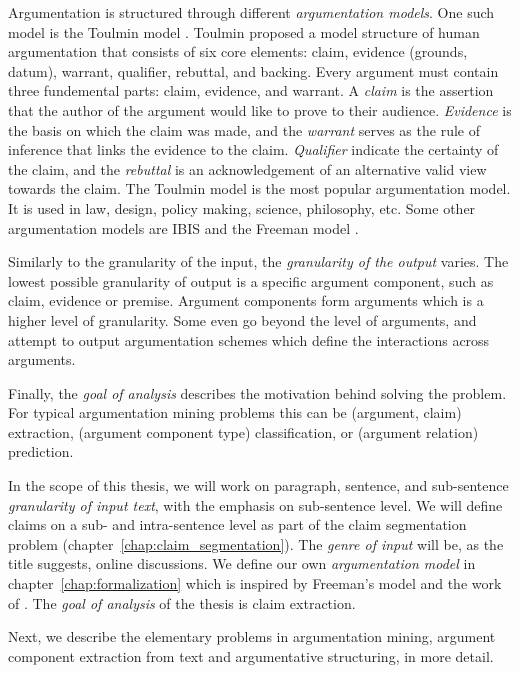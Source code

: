 Argumentation is structured through different \emph{argumentation models}. One
such model is the Toulmin model \citep{toulmin2003uses}. Toulmin proposed a
model structure of human argumentation that consists of six core elements:
claim, evidence (grounds, datum), warrant, qualifier, rebuttal, and backing.
Every argument must contain three fundemental parts: claim, evidence, and
warrant. A \emph{claim} is the assertion that the author of the argument would
like to prove to their audience. \emph{Evidence} is the basis on which the
claim was made, and the \emph{warrant} serves as the rule of inference that
links the evidence to the claim. \emph{Qualifier} indicate the certainty of the
claim, and the \emph{rebuttal} is an acknowledgement of an alternative  valid
view towards the claim.  The Toulmin model is the most popular argumentation
model. It is used in law, design, policy making, science, philosophy, etc.
Some other argumentation models are IBIS \citep{kunz1970issues} and the Freeman
model \citep{freeman2011argument}. 

Similarly to the granularity of the input, the \emph{granularity of the output}
varies. The lowest possible granularity of output is a specific argument
component, such as claim, evidence or premise. Argument components form arguments
which is a higher level of granularity. Some even go beyond the level of arguments, 
and attempt to output argumentation schemes \citep{feng2011classifying} which
define the interactions across arguments. 

Finally, the \emph{goal of analysis} describes the motivation 
behind solving the problem. For typical argumentation mining problems
this can be (argument, claim) extraction, 
(argument component type) classification, or 
(argument relation) prediction. 

In the scope of this thesis, we will work on paragraph, sentence, and
sub-sentence \emph{granularity of input text}, with the emphasis on
sub-sentence level. We will define claims on a sub- and intra-sentence level as
part of the claim segmentation problem (chapter~\ref{chap:claim_segmentation}).
The \emph{genre of input} will be, as the title suggests, online discussions.
We define our own \emph{argumentation model} in
chapter~\ref{chap:formalization} which is inspired by Freeman's model and the
work of \citet{hashimoto2012excitatory}.
The \emph{goal of analysis} of the thesis is claim extraction.

Next, we describe the elementary problems in argumentation mining, 
argument component extraction from text and argumentative structuring, 
in more detail.

